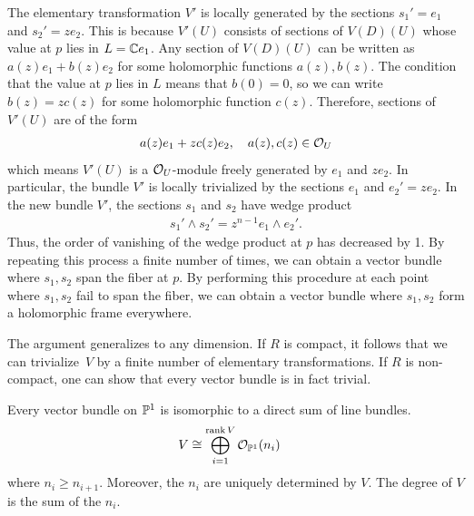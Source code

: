 \documentclass[12pt]{article}
\begin{document}
\begin{solution}
    The elementary transformation $V'$ is locally generated by the sections $s_1' = e_1$ and $s_2' = z e_2$. This is because $V'(U)$ consists of sections of $V(D)(U)$ whose value at $p$ lies in $L = \C e_1$. Any section of $V(D)(U)$ can be written as $a(z)e_1 + b(z)e_2$ for some holomorphic functions $a(z), b(z)$. The condition that the value at $p$ lies in $L$ means that $b(0) = 0$, so we can write $b(z) = z c(z)$ for some holomorphic function $c(z)$. Therefore, sections of $V'(U)$ are of the form \begin{align*}
        a(z)e_1 + z c(z)e_2, \quad a(z), c(z) \in \cO_U
    \end{align*} which means $V'(U)$ is a $\cO_U$-module freely generated by $e_1$ and $z e_2$. In particular, the bundle $V'$ is locally trivialized by the sections $e_1$ and $e_2' = z e_2$. In the new bundle $V'$, the sections $s_1$ and $s_2$ have wedge product \begin{align*}
        s_1' \wedge s_2' = z^{n-1} e_1 \wedge e_2'.
    \end{align*} Thus, the order of vanishing of the wedge product at $p$ has decreased by 1. By repeating this process a finite number of times, we can obtain a vector bundle where $s_1, s_2$ span the fiber at $p$. By performing this procedure at each point where $s_1, s_2$ fail to span the fiber, we can obtain a vector bundle where $s_1, s_2$ form a holomorphic frame everywhere.
\end{solution}

\begin{remark}
The argument generalizes to any dimension. If $R$ is compact, it follows that we can trivialize~$V$ by a finite number of elementary transformations. If $R$ is non-compact, one can show that every vector bundle is in fact trivial.
\end{remark}




\begin{theorem}\label{thm:grothendieck}
    Every vector bundle on $\P^1$ is isomorphic to a direct sum of line bundles.
\begin{align*}
    V & \cong \bigoplus_{i=1}^{\operatorname{rank} V} \mathcal{O}_{\P^1}(n_i)
\end{align*}
where $n_i \geq n_{i+1}$. Moreover, the $n_i$ are uniquely determined by $V$. The degree of $V$ is the sum of the $n_i$.
\end{theorem}
\end{document}
